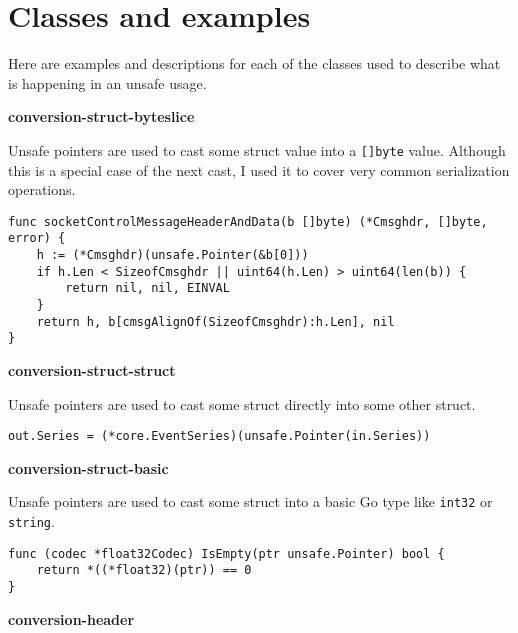 
\section{Classes and examples}\label{sec:survey-small-classes}

Here are examples and descriptions for each of the classes used to describe what is happening in an unsafe usage.

\textbf{conversion-struct-byteslice}

Unsafe pointers are used to cast some struct value into a \texttt{[]byte} value.
Although this is a special case of the next cast, I used it to cover very common serialization operations.

\begin{lstlisting}[language=Golang, label=lst:survey-small-classexample-conversion-struct-byteslice, caption=Usage class example: conversion-struct-byteslice]
func socketControlMessageHeaderAndData(b []byte) (*Cmsghdr, []byte, error) {
    h := (*Cmsghdr)(unsafe.Pointer(&b[0]))
    if h.Len < SizeofCmsghdr || uint64(h.Len) > uint64(len(b)) {
        return nil, nil, EINVAL
    }
    return h, b[cmsgAlignOf(SizeofCmsghdr):h.Len], nil
}
\end{lstlisting}


\textbf{conversion-struct-struct}

Unsafe pointers are used to cast some struct directly into some other struct.

\begin{lstlisting}[language=Golang, label=lst:survey-small-classexample-conversion-struct-struct, caption=Usage class example: conversion-struct-struct]
out.Series = (*core.EventSeries)(unsafe.Pointer(in.Series))
\end{lstlisting}


\textbf{conversion-struct-basic}

Unsafe pointers are used to cast some struct into a basic Go type like \texttt{int32} or \texttt{string}.

\begin{lstlisting}[language=Golang, label=lst:survey-small-classexample-conversion-struct-basic, caption=Usage class example: conversion-struct-basic]
func (codec *float32Codec) IsEmpty(ptr unsafe.Pointer) bool {
    return *((*float32)(ptr)) == 0
}
\end{lstlisting}


\textbf{conversion-header}

